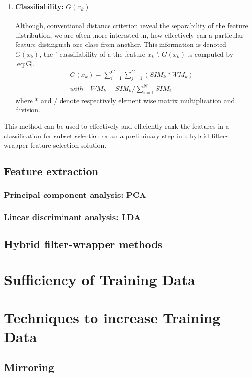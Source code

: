 \begin{enumerate}
	
	\item \textbf{Classifiability: \(G(x_k)\)} \\\\
	Although, conventional distance criterion reveal the separability of the feature distribution, %
	 we are often more interested in, how effectively can a particular feature distinguish one class from another. This information is denoted \(G(x_k)\), the ' classifiability of a the feature \(x_k\) '.
	 \(G(x_k)\) is computed by \ref{eq:G}.
	 \begin{align}
	 	G(x_k) = \sum_{i = 1}^{C}\sum_{j = 1}^{C}(SIM_k*WM_k) \label{eq:G}
	 	\\ with \quad WM_k = SIM_k / \sum_{i=1}^{N}SIM_i
	 \end{align}
	 where * and / denote respectively element wise matrix multiplication and division.
\end{enumerate}

This method can be used to effectively and efficiently rank the features in a classification for subset selection or an a preliminary step in a hybrid filter-wrapper feature selection solution.  

\subsection{Feature extraction}
\subsubsection{Principal component analysis: PCA}
\subsubsection{Linear discriminant analysis: LDA}

\subsection{Hybrid filter-wrapper methods}

\section{Sufficiency of Training Data}
\section{Techniques to increase Training Data}
\subsection{Mirroring}